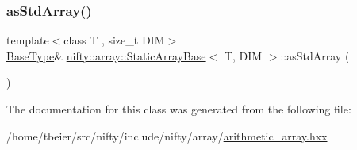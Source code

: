\subsubsection{\texorpdfstring{as\+Std\+Array()}{asStdArray()}\hspace{0.1cm}{\footnotesize\ttfamily [2/2]}}
{\footnotesize\ttfamily template$<$class T , size\+\_\+t D\+IM$>$ \\
\hyperlink{classnifty_1_1array_1_1StaticArrayBase_a3f376d2a24fad3a47021c36657494759}{Base\+Type}\& \hyperlink{classnifty_1_1array_1_1StaticArrayBase}{nifty\+::array\+::\+Static\+Array\+Base}$<$ T, D\+IM $>$\+::as\+Std\+Array (\begin{DoxyParamCaption}{ }\end{DoxyParamCaption})\hspace{0.3cm}{\ttfamily [inline]}}



The documentation for this class was generated from the following file\+:\begin{DoxyCompactItemize}
\item 
/home/tbeier/src/nifty/include/nifty/array/\hyperlink{arithmetic__array_8hxx}{arithmetic\+\_\+array.\+hxx}\end{DoxyCompactItemize}
